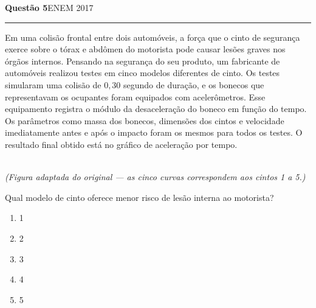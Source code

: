 \documentclass[11pt,a4paper]{article}
\newcommand{\fonte}[1]{{\small\scshape\color{grafite}#1}}
\newenvironment{questao}[2]{%
  \needspace{6\baselineskip}
  \par\addvspace{1.6em}
  {\large\bfseries\color{vinho}Quest\~ao #1}\hfill #2\\[-0.55em]
  {\color{black!25}\rule{\linewidth}{0.4pt}}
  \par\nobreak\smallskip
}{\par\addvspace{0.4em}}
\begin{document}
\begin{questao}{5}{\fonte{ENEM 2017}}
Em uma colis\~ao frontal entre dois autom\'oveis, a for\c{c}a que o
cinto de seguran\c{c}a exerce sobre o t\'orax e abd\^omen do motorista
pode causar les\~oes graves nos \'org\~aos internos. Pensando na
seguran\c{c}a do seu produto, um fabricante de autom\'oveis realizou
testes em cinco modelos diferentes de cinto. Os testes simularam uma
colis\~ao de $0{,}30$ segundo de dura\c{c}\~ao, e os bonecos que
representavam os ocupantes foram equipados com aceler\^ometros. Esse
equipamento registra o m\'odulo da desacelera\c{c}\~ao do boneco em
fun\c{c}\~ao do tempo. Os par\^ametros como massa dos bonecos,
dimens\~oes dos cintos e velocidade imediatamente antes e ap\'os o
impacto foram os mesmos para todos os testes. O resultado final obtido
est\'a no gr\'afico de acelera\c{c}\~ao por tempo.

\begin{center}
\\
{\small\itshape (Figura adaptada do original --- as cinco curvas
correspondem aos cintos 1 a 5.)}
\end{center}

Qual modelo de cinto oferece menor risco de les\~ao interna ao
motorista?
\begin{enumerate}
  \item 1
  \item 2
  \item 3
  \item 4
  \item 5
\end{enumerate}
\end{questao}
\end{document}
